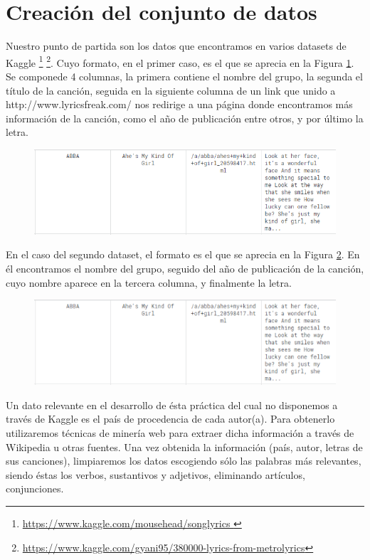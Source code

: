\section{Creación del conjunto de datos}
Nuestro punto de partida son los datos que encontramos en varios datasets de Kaggle \footnote{\url{https://www.kaggle.com/mousehead/songlyrics }} \footnote{\url{https://www.kaggle.com/gyani95/380000-lyrics-from-metrolyrics}}. Cuyo formato, en el primer caso, es el que se aprecia en la Figura \ref{fig:dataset1}. Se componede 4 columnas, la primera contiene el nombre del grupo, la segunda el título de la canción, seguida en la siguiente columna de un link que unido a http://www.lyricsfreak.com/ nos redirige a una página donde encontramos más información de la canción, como el año de publicación entre otros, y por último la letra.
\begin{figure}
	\centering
	\includegraphics[width=0.7\linewidth]{Imagenes/dataset1}
	\caption{}
	\label{fig:dataset1}
\end{figure}
En el caso del segundo dataset, el formato es el que se aprecia en la Figura \ref{fig:dataset2}. En él encontramos el nombre del grupo, seguido del año de publicación de la canción, cuyo nombre aparece en la tercera columna, y finalmente la letra.
\begin{figure}
	\centering
	\includegraphics[width=0.7\linewidth]{Imagenes/dataset2}
	\caption{}
	\label{fig:dataset2}
\end{figure}

Un dato relevante en el desarrollo de ésta práctica del cual no disponemos a través de Kaggle es el país de procedencia de cada autor(a). Para obtenerlo utilizaremos técnicas de minería web para extraer dicha información a través de Wikipedia u otras fuentes. Una vez obtenida la información (país, autor, letras de sus canciones), limpiaremos los datos escogiendo sólo las palabras más relevantes, siendo éstas los verbos, sustantivos y adjetivos, eliminando artículos, conjunciones.

